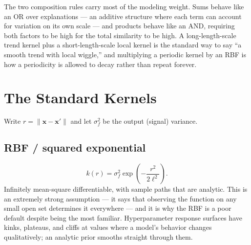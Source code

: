 \documentclass[conference]{IEEEtran}
\begin{document}
The two composition rules carry most of the modeling weight. Sums behave like an OR over explanations --- an additive structure where each term can account for variation on its own scale --- and products behave like an AND, requiring both factors to be high for the total similarity to be high. A long-length-scale trend kernel plus a short-length-scale local kernel is the standard way to say ``a smooth trend with local wiggle,'' and multiplying a periodic kernel by an RBF is how a periodicity is allowed to decay rather than repeat forever.

\section*{The Standard Kernels}
Write $r = \|\mathbf{x}-\mathbf{x}'\|$ and let $\sigma_f^2$ be the output (signal) variance.

\subsection*{RBF / squared exponential}
\begin{equation}
    k(r) = \sigma_f^2 \exp\!\left(-\frac{r^2}{2\ell^2}\right).
\end{equation}
Infinitely mean-square differentiable, with sample paths that are analytic. This is an extremely strong assumption --- it says that observing the function on any small open set determines it everywhere --- and it is why the RBF is a poor default despite being the most familiar. Hyperparameter response surfaces have kinks, plateaus, and cliffs at values where a model's behavior changes qualitatively; an analytic prior smooths straight through them.
\end{document}
